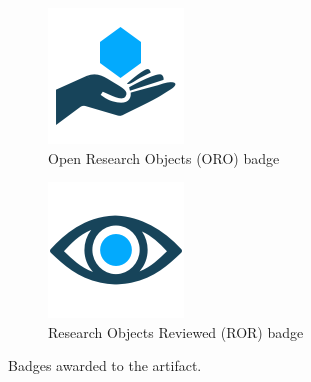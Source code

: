 \begin{figure}[H]
  \centering
  \begin{subfigure}{0.3\linewidth}
    \includegraphics[width=\linewidth]{kappa/img/Open_research.png}
    \caption{Open Research Objects (ORO) badge}
    \label{fig:ORO}
  \end{subfigure}\hspace{2cm}
  \begin{subfigure}{0.3\linewidth}
    \includegraphics[width=\linewidth]{kappa/img/Research_Objects.png}
    \caption{Research Objects Reviewed (ROR) badge}
    \label{fig:ROR}
  \end{subfigure}
  \caption{Badges awarded to the artifact.}
  \label{fig:badges}
\end{figure}



